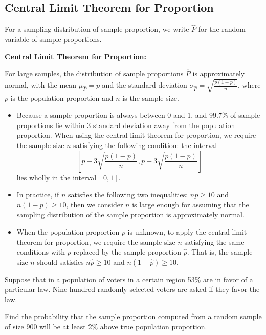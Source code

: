 \hypertarget{central-limit-theorem-for-proportion}{%
\subsection{Central Limit Theorem for
Proportion}\label{central-limit-theorem-for-proportion}}

For a sampling distribution of sample proportion, we write \(\hat{P}\)
for the random variable of sample proportions.

\begin{theorem}

\textbf{Central Limit Theorem for Proportion:}

For large samples, the distribution of sample proportions \(\hat{P}\) is
approximately normal, with the mean \(\mu_{\hat{P}}=p\) and the standard
deviation \(\sigma_{\hat{P}}=\sqrt{\frac{p(1-p)}{n}}\), where \(p\) is
the population proportion and \(n\) is the sample size.

\end{theorem}

\begin{itemize}
\item
  Because a sample proportion is always between 0 and 1, and 99.7\% of sample
  proportions lie within 3 standard deviation away from the population
  proportion. When using the central limit theorem for proportion, we
  require the sample size \(n\) satisfying the following condition: the
  interval
  \[\left[p-3\sqrt{\frac{p(1-p)}{n}}, p+3\sqrt{\frac{p(1-p)}{n}}\right]\]
  lies wholly in the interval \([0, 1]\).
\item
  In practice, if \(n\) satisfies the following two inequalities:
  \(np\ge 10\) and \(n(1-p)\ge 10\), then we consider \(n\) is large
  enough for assuming that the sampling distribution of the sample
  proportion is approximately normal.
\item
  When the population proportion \(p\) is unknown, to apply the central
  limit theorem for proportion, we require the sample size \(n\)
  satisfying the same conditions with \(p\) replaced by the sample
  proportion \(\hat{p}\). That is, the sample size \(n\) should
  satisfies \(n\hat{p}\ge 10\) and \(n(1-\hat{p})\ge 10\).
\end{itemize}

\begin{example}

Suppose that in a population of voters in a certain region 53\% are in
favor of a particular law. Nine hundred randomly selected voters are
asked if they favor the law.

Find the probability that the sample proportion computed from a random
sample of size 900 will be at least 2\% above true population
proportion.

\end{example}

